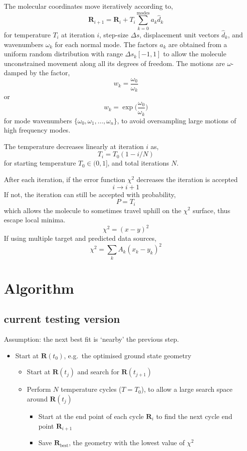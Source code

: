 \documentclass[]{article}
\newcommand{\bfR}{\textbf{R}}
\begin{document}
	The molecular coordinates move iteratively according to,
	\[
	\textbf{R}_{i+1} = \textbf{R}_{i} + T_i\sum_{k=0}^{\textrm{modes}}a_k\hat{d}_k
	\]
	for temperature $T_i$ at iteration $i$, step-size $\Delta s$, displacement unit vectors $\hat{d}_k$, and wavenumbers $\omega_k$ for each normal mode. The factors $a_k$ are obtained from a uniform random distribution with range $\Delta s_k[-1, 1]$ to allow the molecule unconstrained movement along all its degrees of freedom.
	The motions are $\omega$-damped by the factor,
	\[
	w_k = \frac{\omega_0}{\omega_k}
	\]
	or
	\[
	w_k = \exp\Big(\frac{\omega_0}{\omega_k}\Big)
	\]
	for mode wavenumbers $\{\omega_0, \omega_1, \dots, \omega_n\}$, to avoid oversampling large motions of high frequency modes.
	
	The temperature decreases linearly at iteration $i$ as,
	\[
	T_i = T_0(1 - i / N)
	\]
	for starting temperature $T_0\in(0, 1]$, and total iterations $N$.
	
	After each iteration, if the error function $\chi^2$ decreases the iteration is accepted
	\[
	i\rightarrow i+1
	\]
	If not, the iteration can still be accepted with probability,
	\[
	P = T_i
	\]
	which allows the molecule to sometimes travel uphill on the $\chi^2$ surface, thus escape local minima.
	\[
	\chi^2 = (x-y)^2
	\]
	If using multiple target and predicted data sources,
	\[
	\chi^2 = \sum_k A_k(x_k-y_k)^2
	\]
	\section{Algorithm}
	
	\subsection{current testing version}
	
	Assumption: the next best fit is `nearby' the previous step.
	
	\begin{itemize}
		\item Start at $\bfR(t_0)$, e.g.\ the optimised ground state geometry
		\begin{itemize}
			\item Start at $\bfR(t_j)$ and search for $\bfR(t_{j+1})$
			\item Perform $N$ temperature cycles ($T = T_0$), to allow a large search space around $\bfR(t_j)$
			\begin{itemize}
				\item Start at the end point of each cycle $\bfR_i$ to find the next cycle end point $\bfR_{i+1}$
				\item Save $\bfR_\textrm{best}$, the geometry with the lowest value of $\chi^2$
				
			\end{itemize}
		\end{itemize}
		
	\end{itemize}
	
\end{document}
